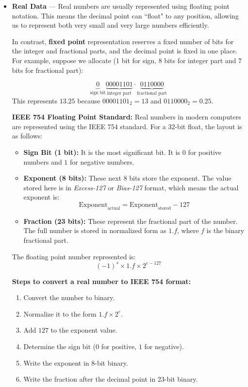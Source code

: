 \documentclass[12pt]{book}
\begin{document}
\begin{itemize}
\item \textbf{Real Data} — Real numbers are usually represented using floating point notation. This means the decimal point can ``float" to any position, allowing us to represent both very small and very large numbers efficiently.

In contrast, \textbf{fixed point} representation reserves a fixed number of bits for the integer and fractional parts, and the decimal point is fixed in one place. For example, suppose we allocate (1 bit for sign, 8 bits for integer part and 7 bits for fractional part):

\[
\underbrace{0}_{\text{sign bit}} \underbrace{00001101}_{\text{integer part}} \cdot \underbrace{0110000}_{\text{fractional part}}
\]
This represents $13.25$ because $00001101_2 = 13$ and $0110000_2 = 0.25$.

\medskip
\textbf{IEEE 754 Floating Point Standard:} Real numbers in modern computers are represented using the IEEE 754 standard. For a 32-bit float, the layout is as follows:
\begin{itemize}
    \item \textbf{Sign Bit (1 bit):} It is the most significant bit. It is $0$ for positive numbers and $1$ for negative numbers.
    \item \textbf{Exponent (8 bits):} These next 8 bits store the exponent. The value stored here is in \textit{Excess-127} or \textit{Bias-127} format, which means the actual exponent is: 
    \[
    \text{Exponent}_{\text{actual}} = \text{Exponent}_{\text{stored}} - 127
    \]
    \item \textbf{Fraction (23 bits):} These represent the fractional part of the number. The full number is stored in normalized form as $1.f$, where $f$ is the binary fractional part.
\end{itemize}

The floating point number represented is:
\[
(-1)^s \times 1.f \times 2^{e - 127}
\]

\medskip
\textbf{Steps to convert a real number to IEEE 754 format:}
\begin{enumerate}
    \item Convert the number to binary.
    \item Normalize it to the form $1.f \times 2^e$.
    \item Add $127$ to the exponent value.
    \item Determine the sign bit ($0$ for positive, $1$ for negative).
    \item Write the exponent in 8-bit binary.
    \item Write the fraction after the decimal point in 23-bit binary.
\end{enumerate}


\end{itemize}
\end{document}
